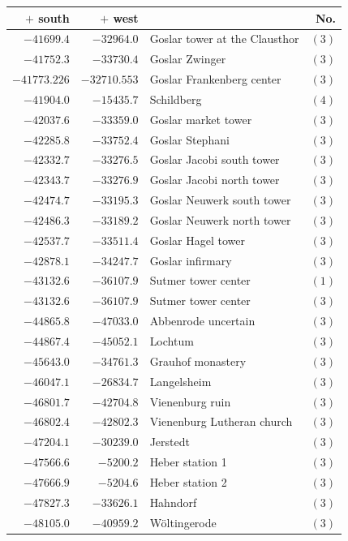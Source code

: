 \clearpage{}%
\begin{center}\begingroup\fontsize{8}{9}\selectfont
\setlength{\tabcolsep}{4pt}
\begin{tabular}{r|r|p{170pt}|r}\hline
\(+\) south&\(+\) west&&No.\\\hline
\(-41699.4\)&\(-32964.0\)&Goslar tower at the Clausthor&\((3)\)\\
\(-41752.3\)&\(-33730.4\)&Goslar Zwinger&\((3)\)\\
\(-41773.226\)&\(-32710.553\)&Goslar Frankenberg center&\((3)\)\\
\(-41904.0\)&\(-15435.7\)&Schildberg&\((4)\)\\
\(-42037.6\)&\(-33359.0\)&Goslar market tower&\((3)\)\\
\(-42285.8\)&\(-33752.4\)&Goslar Stephani&\((3)\)\\
\(-42332.7\)&\(-33276.5\)&Goslar Jacobi south tower&\((3)\)\\
\(-42343.7\)&\(-33276.9\)&Goslar Jacobi north tower&\((3)\)\\
\(-42474.7\)&\(-33195.3\)&Goslar Neuwerk south tower&\((3)\)\\
\(-42486.3\)&\(-33189.2\)&Goslar Neuwerk north tower&\((3)\)\\
\(-42537.7\)&\(-33511.4\)&Goslar Hagel tower&\((3)\)\\
\(-42878.1\)&\(-34247.7\)&Goslar infirmary&\((3)\)\\
\(-43132.6\)&\(-36107.9\)&Sutmer tower center&\((1)\)\\
\(-43132.6\)&\(-36107.9\)&Sutmer tower center&\((3)\)\\
\(-44865.8\)&\(-47033.0\)&Abbenrode uncertain&\((3)\)\\
\(-44867.4\)&\(-45052.1\)&Lochtum&\((3)\)\\
\(-45643.0\)&\(-34761.3\)&Grauhof monastery&\((3)\)\\
\(-46047.1\)&\(-26834.7\)&Langelsheim&\((3)\)\\
\(-46801.7\)&\(-42704.8\)&Vienenburg ruin&\((3)\)\\
\(-46802.4\)&\(-42802.3\)&Vienenburg Lutheran church&\((3)\)\\
\(-47204.1\)&\(-30239.0\)&Jerstedt&\((3)\)\\
\(-47566.6\)&\(-5200.2\)&Heber station 1&\((3)\)\\
\(-47666.9\)&\(-5204.6\)&Heber station 2&\((3)\)\\
\(-47827.3\)&\(-33626.1\)&Hahndorf&\((3)\)\\
\(-48105.0\)&\(-40959.2\)&Wöltingerode&\((3)\)\\

\end{tabular}
\end{center}
